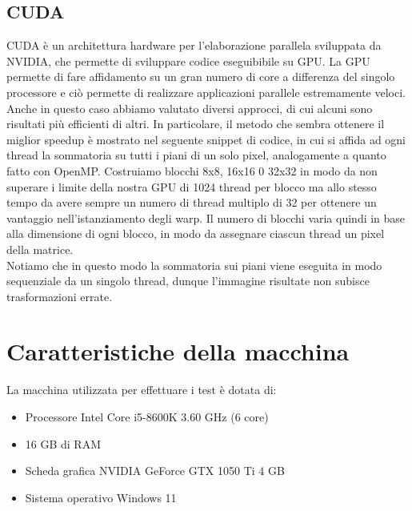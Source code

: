 \documentclass[11pt]{article}
\begin{document}
    \subsection{CUDA}\label{subsec:cuda}
    CUDA è un architettura hardware per l'elaborazione parallela sviluppata da NVIDIA, che permette di sviluppare codice eseguibibile su GPU.
    La GPU permette di fare affidamento su un gran numero di core a differenza del singolo processore e ciò permette di realizzare applicazioni parallele estremamente veloci.\\

    Anche in questo caso abbiamo valutato diversi approcci, di cui alcuni sono risultati più efficienti di altri.
    In particolare, il metodo che sembra ottenere il miglior speedup è mostrato nel seguente snippet di codice, in cui si affida ad ogni thread la sommatoria su tutti i piani di un solo pixel, analogamente a quanto fatto con OpenMP.
    Costruiamo blocchi 8x8, 16x16 0 32x32 in modo da non superare i limite della nostra GPU di 1024 thread per blocco ma allo stesso tempo da avere sempre un numero di thread multiplo di 32 per ottenere un vantaggio nell'istanziamento degli warp.
    Il numero di blocchi varia quindi in base alla dimensione di ogni blocco, in modo da assegnare ciascun thread un pixel della matrice.\\
    
    
    Notiamo che in questo modo la sommatoria sui piani viene eseguita in modo sequenziale da un singolo thread, dunque l'immagine risultate non subisce trasformazioni errate.


    \section{Caratteristiche della macchina}\label{sec:caratteristiche-della-macchina}
    La macchina utilizzata per effettuare i test è dotata di:
    \begin{itemize}
        \item Processore Intel Core i5-8600K 3.60 GHz (6 core)
        \item 16 GB di RAM
        \item Scheda grafica NVIDIA GeForce GTX 1050 Ti 4 GB
        \item Sistema operativo Windows 11
    \end{itemize}
\end{document}
